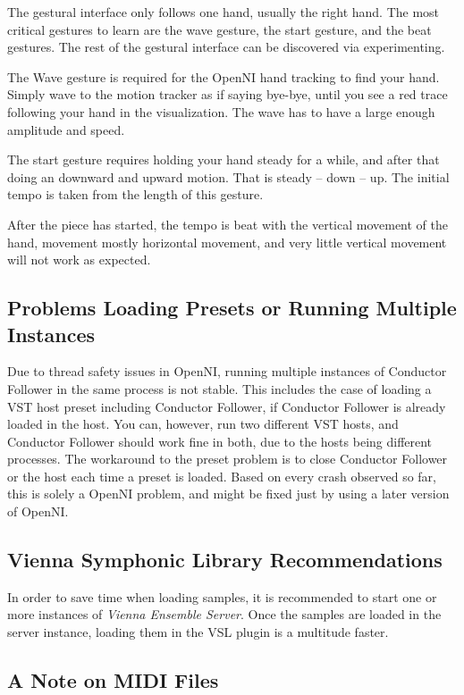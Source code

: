 \documentclass[12pt,a4paper]{article}
\newcommand{\CF}{Conductor Follower}
\begin{document}
The gestural interface only follows one hand,
usually the right hand.
The most critical gestures to learn are
the wave gesture,
the start gesture,
and the beat gestures.
The rest of the gestural interface can be discovered via experimenting.

The Wave gesture is required for the OpenNI hand tracking to find your hand.
Simply wave to the motion tracker as if saying bye-bye,
until you see a red trace following your hand in the visualization.
The wave has to have a large enough amplitude and speed.

The start gesture requires holding your hand steady for a while,
and after that doing an downward and upward motion.
That is steady -- down -- up.
The initial tempo is taken from the length of this gesture.

After the piece has started,
the tempo is beat with the vertical movement of the hand,
movement mostly horizontal movement,
and very little vertical movement will not work as expected.

\subsection{Problems Loading Presets or Running Multiple Instances}

Due to thread safety issues in OpenNI,
running multiple instances of \CF{} in the same process is not stable.
This includes the case of loading a VST host preset including \CF{},
if \CF{} is already loaded in the host.
You can, however, run two different VST hosts,
and \CF{} should work fine in both,
due to the hosts being different processes.
The workaround to the preset problem is to close
\CF{} or the host each time a preset is loaded.
Based on every crash observed so far,
this is solely a OpenNI problem,
and might be fixed just by using a later version of OpenNI.

\subsection{Vienna Symphonic Library Recommendations}

In order to save time when loading samples,
it is recommended to start
one or more instances of \textit{Vienna Ensemble Server}.
Once the samples are loaded in the server instance,
loading them in the VSL plugin is a multitude faster.

\subsection{A Note on MIDI Files}
\end{document}
